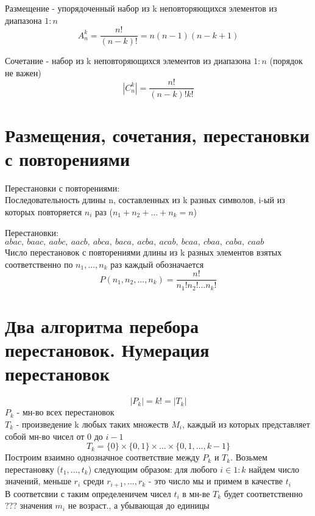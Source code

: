 \documentclass[12pt, fleqn]{article}
\begin{document}
\begin{definition}
  Размещение - упорядоченный набор из k неповторяющихся элементов из диапазона $1:n$
  \[A_n^k = \dfrac{n!}{(n-k)!} = n (n-1)(n-k+1)\]
\end{definition}

\begin{definition}
  Сочетание - набор из k неповторяющихся элементов из диапазона $1:n$ (порядок не важен)
  \[|C_n^k| = \dfrac{n!}{(n-k)! k!}\]
\end{definition}

\section{Размещения, сочетания, перестановки с повторениями}
Перестановки с повторениями:\\
Последовательность длины n, составленных из k разных символов, i-ый из которых повторяется $n_i$ раз ($n_1 + n_2 + ... + n_k = n$)
\begin{example}[aabc]
  Перестановки: $abac,\ baac,\ aabc,\ aacb,\ abca,\ baca,\ acba,\ acab,\ bcaa,\ cbaa,\ caba,\ caab$\\
  Число перестановок с повторениями длины из k разных элементов взятых соответственно по $n_1,...,n_k$ раз каждый обозначается
  \[P(n_1,n_2,...,n_k) = \dfrac{n!}{n_1! n_2! ... n_k!}\]
\end{example}

\section{Два алгоритма перебора перестановок. Нумерация перестановок}
\[|P_k| = k! = |T_k|\]
$P_k$ - мн-во всех перестановок\\
$T_k$ - произведение k любых таких множеств $M_i$, каждый из которых представляет собой мн-во чисел от 0 до $i-1$
\[T_k = \{0\} \times \{0,1\} \times ... \times \{0,1,...,k-1\}\]
Построим взаимно однозначное соответствие между $P_k$ и $T_k$. Возьмем перестановку ($t_1,...,t_k$) следующим образом: для любого $i \in 1:k$ найдем число значений, меньше $r_i$ среди $r_{i+1},...,r_k$ - это число мы и примем в качестве $t_i$\\
В соответсвии с таким определеничем чисел $t_i$ в мн-ве $T_k$ будет соответственно ??? значения $m_i$ не возраст., а убывающая до единицы
\end{document}
